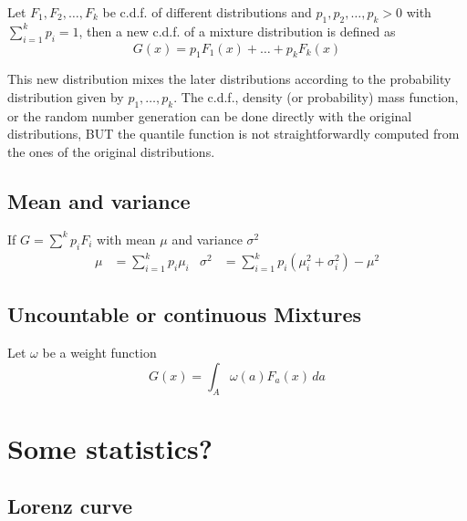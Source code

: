 Let $F_1,F_2,\dots,F_k$ be c.d.f. of different distributions and
$p_1,p_2,\dots,p_k>0$ with $\sum_{i=1}^kp_i=1$, then a new c.d.f. of a mixture
distribution is defined as
\begin{equation*}
    G(x) = p_1F_1(x) + \dots + p_kF_k(x)
\end{equation*}

This new distribution mixes the later distributions according to the probability
 distribution given by $p_1,\dots,p_k$. The c.d.f., density (or probability) 
mass function, or the random number generation can be done directly with the 
original distributions, BUT the quantile function is not straightforwardly 
computed from the ones of the original distributions. 


\subsection{Mean and variance} %
\label{sub:mean_and_variance}

If $G=\sum^kp_iF_i$ with mean $\mu$ and variance $\sigma^2$
\begin{align*}
    \mu &= \sum_{i=1}^k p_i\mu_i & \sigma^2 &= \sum_{i=1}^k p_i
    (\mu^2_i+\sigma^2_i)-\mu^2
\end{align*}

\subsection{Uncountable or continuous Mixtures} %
\label{sub:uncountable_or_continuous_mixtures}

Let $\omega$ be a weight function 
\begin{equation*}
    G(x) = \int_A \omega(a)F_a(x)\,da
\end{equation*}

\section{Some statistics?} %
\label{sec:some_statistics_}


\subsection{Lorenz curve} %
\label{sub:lorenz_curve}

